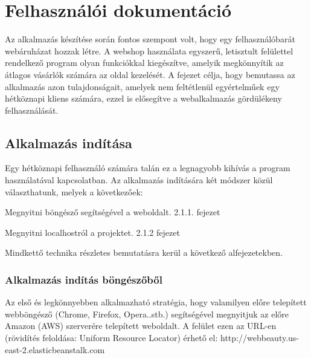 \chapter{Felhasználói dokumentáció} %
\label{ch:user}

Az alkalmazás készítése során fontos szempont volt, hogy egy felhasználóbarát webáruházat hozzak létre. A webshop használata egyszerű, letisztult felülettel rendelkező program olyan funkciókkal kiegészítve, amelyik megkönnyítik az átlagos vásárlók számára az oldal kezelését. A fejezet célja, hogy bemutassa az alkalmazás azon tulajdonságait, amelyek nem feltétlenül egyértelműek egy hétköznapi kliens számára, ezzel is elősegítve a webalkalmazás gördülékeny felhasználását.


\section{Alkalmazás indítása} %

Egy hétköznapi felhasználó számára talán ez a legnagyobb kihívás a program használatával kapcsolatban. Az alkalmazás indítására két módszer közül választhatunk, melyek a következőek:

\begin{compactenum}
	\item Megnyitni böngésző segítségével a weboldalt. 2.1.1. fejezet
	\item Megnyitni localhostról a projektet. 2.1.2 fejezet
\end{compactenum}

\bigskip
Mindkettő technika részletes bemutatásra kerül a következő alfejezetekben.

\subsection{Alkalmazás indítás böngészőből}
Az első és legkönnyebben alkalmazható stratégia, hogy valamilyen előre telepített webböngésző (Chrome, Firefox, Opera..stb.) segítségével megnyitjuk az előre Amazon (AWS) szerverére telepített weboldalt. A felület ezen az URL-en (rövidítés feloldása: Uniform Resource Locator) érhető el: http://webbeauty.us-east-2.elasticbeanstalk.com

